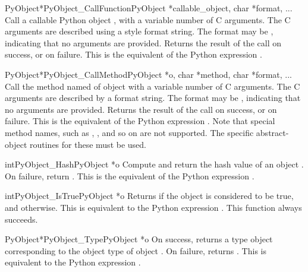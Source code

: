 \documentclass{manual}
\begin{document}
\begin{cfuncdesc}{PyObject*}{PyObject_CallFunction}{PyObject *callable_object,
                                                    char *format, ...}
Call a callable Python object , with a
variable number of C arguments. The C arguments are described
using a  style format string. The format may
be \NULL{}, indicating that no arguments are provided.  Returns the
result of the call on success, or \NULL{} on failure.  This is
the equivalent of the Python expression .
\end{cfuncdesc}


\begin{cfuncdesc}{PyObject*}{PyObject_CallMethod}{PyObject *o,
                                           char *method, char *format, ...}
Call the method named  of object  with a variable number
of C arguments.  The C arguments are described by a
 format string.  The format may be \NULL{},
indicating that no arguments are provided. Returns the result of the
call on success, or \NULL{} on failure.  This is the equivalent of the
Python expression .
Note that special method names, such as ,
, and so on are not supported.  The specific
abstract-object routines for these must be used.
\end{cfuncdesc}


\begin{cfuncdesc}{int}{PyObject_Hash}{PyObject *o}
Compute and return the hash value of an object .  On
failure, return .  This is the equivalent of the Python
expression .
\end{cfuncdesc}


\begin{cfuncdesc}{int}{PyObject_IsTrue}{PyObject *o}
Returns  if the object  is considered to be true, and
 otherwise. This is equivalent to the Python expression
.
This function always succeeds.
\end{cfuncdesc}


\begin{cfuncdesc}{PyObject*}{PyObject_Type}{PyObject *o}
On success, returns a type object corresponding to the object
type of object . On failure, returns \NULL{}.  This is
equivalent to the Python expression .
\end{cfuncdesc}
\end{document}
